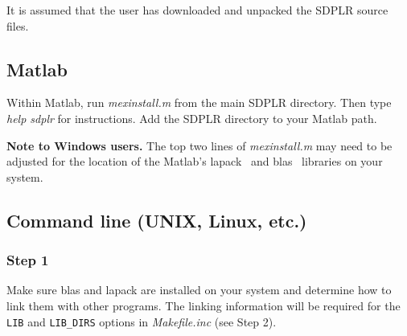 \documentclass[12pt]{article}
\newcommand{\blas}{{\sc blas}}
\newcommand{\blass}{{\sc blas }}
\newcommand{\lapack}{{\sc lapack}}
\newcommand{\lapacks}{{\sc lapack }}
\begin{document}

It is assumed that the user has downloaded and unpacked the SDPLR
source files.

\subsection{Matlab}

Within Matlab, run {\sl mexinstall.m} from the main SDPLR directory.
Then type {\sl help sdplr} for instructions. Add the SDPLR directory to
your Matlab path.

{\bf Note to Windows users.} The top two lines of {\sl mexinstall.m} may
need to be adjusted for the location of the Matlab's \lapack~ and \blas~
libraries on your system.

\subsection{Command line (UNIX, Linux, etc.)}

\subsubsection*{Step 1}

Make sure \blass and \lapacks are installed on your system and
determine how to link them with other programs. The linking
information will be required for the {\tt LIB} and {\tt LIB\_DIRS}
options in {\sl Makefile.inc\/} (see Step 2).



\end{document}
